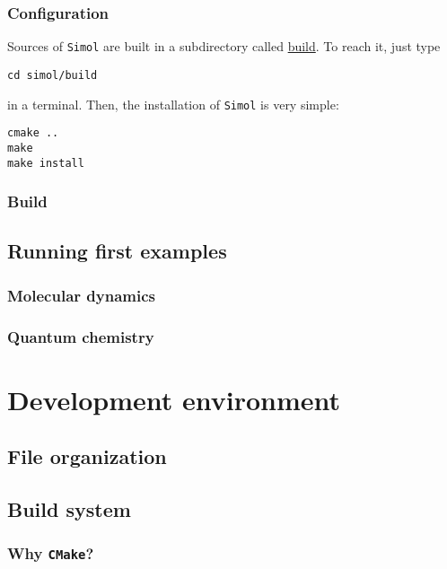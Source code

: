 \documentclass[12pt]{book}
\newcommand{\CMake}{\texttt{CMake}\xspace}
\newcommand{\Simol}{\texttt{Simol}\xspace}
\begin{document}
\subsection{Configuration}

Sources of \Simol are built in a subdirectory called \url{build}. To reach it, just type
\lstset{language=bash} 
\begin{lstlisting}
cd simol/build
\end{lstlisting}
in a terminal. Then, the installation of \Simol is very simple:
\lstset{language=bash} 
\begin{lstlisting}
cmake ..
make
make install
\end{lstlisting}

\subsection{Build}


\section{Running first examples}

\subsection{Molecular dynamics}

\subsection{Quantum chemistry}


\chapter{Development environment}

\section{File organization}
\section{Build system}

\subsection{Why \CMake?}
\end{document}
